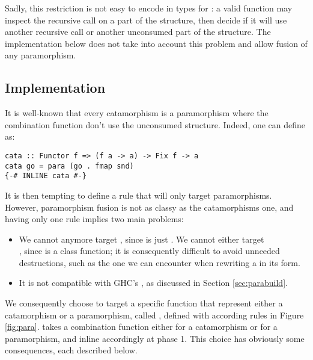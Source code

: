 Sadly, this restriction is not easy to encode in types for : a valid function may inspect the recursive call on a part of the structure, then decide if it will use another recursive call or another unconsumed part of the structure. The implementation below does not take into account this problem and allow fusion of any paramorphism.

\subsection{Implementation}
\label{sec:para-impl}

It is well-known that every catamorphism is a paramorphism where the combination function don't use the unconsumed structure. Indeed, one can define  as:
\begin{verbatim}
cata :: Functor f => (f a -> a) -> Fix f -> a
cata go = para (go . fmap snd)
{-# INLINE cata #-}
\end{verbatim}

\noindent It is then tempting to define a rule that will only target paramorphisms. However, paramorphism fusion is not as classy as the catamorphisms one, and having only one rule implies two main problems:
\begin{itemize}
\item We cannot anymore target , since  is just . We cannot either target\\ , since  is a class function; it is consequently difficult to avoid unneeded destructions, such as the one we can encounter when rewriting a  in its  form.

\item It is not compatible with GHC's , as discussed in Section \ref{sec:parabuild}.
\end{itemize}

We consequently choose to target a specific function that represent either a catamorphism or a paramorphism, called , defined with according rules in Figure \ref{fig:para}.  takes a combination function either for a catamorphism or for a paramorphism, and inline accordingly at phase 1.
This choice has obviously some consequences, each described below.

